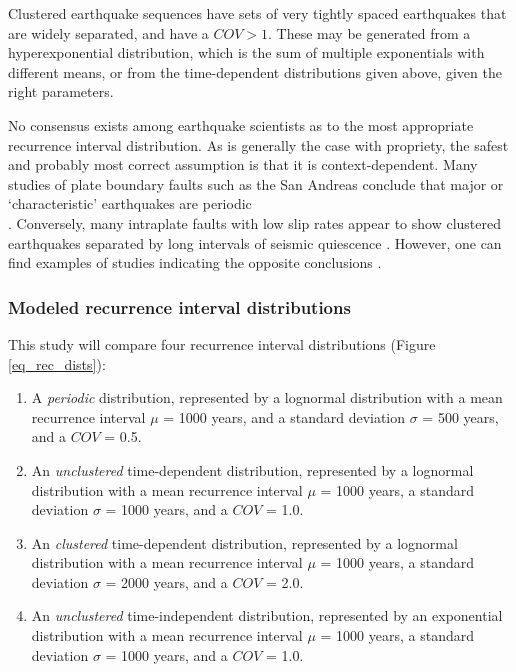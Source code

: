 \documentclass[se, manuscript]{copernicus}
\begin{document}
Clustered earthquake sequences have sets of very tightly spaced
earthquakes that are widely separated, and have a \(COV>1\). These may
be generated from a hyperexponential distribution, which is the sum of
multiple exponentials with different means, or from the time-dependent
distributions given above, given the right parameters.

No consensus exists among earthquake scientists as to the most
appropriate recurrence interval distribution. As is generally the case
with propriety, the safest and probably most correct assumption is that
it is context-dependent. Many studies of plate boundary faults such as
the San Andreas conclude that major or `characteristic' earthquakes are
periodic\\
\citep[e.g.]{berryman_major_2012,scharer_quasi-periodic_2010}.
Conversely, many intraplate faults with low slip rates appear to show
clustered earthquakes separated by long intervals of seismic quiescence
\citep[e.g.]{clark_long-term_2012}. However, one can find examples of
studies indicating the opposite conclusions
\citep{tuttle_earthquake_2002,grant_paleoseismic_1994}.

\subsubsection{Modeled recurrence interval
distributions}\label{modeled-recurrence-interval-distributions}

This study will compare four recurrence interval distributions (Figure
\ref{eq_rec_dists}):

\begin{enumerate}
\def\labelenumi{\arabic{enumi}.}
\item
  A \emph{periodic} distribution, represented by a lognormal
  distribution with a mean recurrence interval \(\mu\) = 1000 years, and
  a standard deviation \(\sigma\) = 500 years, and a \(COV\) = 0.5.
\item
  An \emph{unclustered} time-dependent distribution, represented by a
  lognormal distribution with a mean recurrence interval \(\mu\) = 1000
  years, a standard deviation \(\sigma\) = 1000 years, and a \(COV\) =
  1.0.
\item
  An \emph{clustered} time-dependent distribution, represented by a
  lognormal distribution with a mean recurrence interval \(\mu\) = 1000
  years, a standard deviation \(\sigma\) = 2000 years, and a \(COV\) =
  2.0.
\item
  An \emph{unclustered} time-independent distribution, represented by an
  exponential distribution with a mean recurrence interval \(\mu\) =
  1000 years, a standard deviation \(\sigma\) = 1000 years, and a
  \(COV\) = 1.0.
\end{enumerate}
\end{document}
